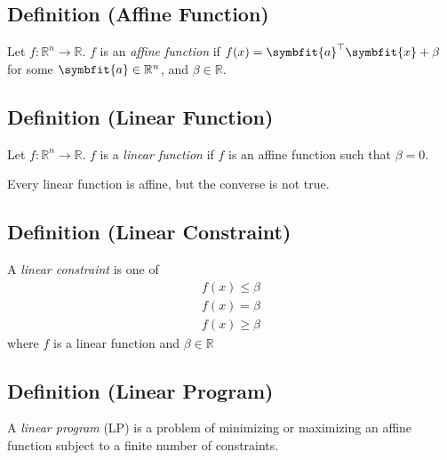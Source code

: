 \begin{defbox}
    \subsection{Definition (Affine Function)}
    Let $f:\mathbb{R}^n\rightarrow\mathbb{R}$. $f$ is an \emph{affine function} if
    $f(x)=\symbfit{a}^\top \symbfit{x}+\beta$ for some $\symbfit{a}\in\mathbb{R}^n$, and $\beta\in\mathbb{R}$.    
\end{defbox}

\begin{defbox}
    \subsection{Definition (Linear Function)}
    Let $f:\mathbb{R}^n\rightarrow\mathbb{R}$. $f$ is a \emph{linear function} if
    $f$ is an affine function such that $\beta=0$.
\end{defbox}

\begin{remark}
    Every linear function is affine, but the converse is not true.
\end{remark}

\begin{defbox}
    \subsection{Definition (Linear Constraint)}
    A \emph{linear constraint} is one of
    \begin{align*}
        f(x)\le \beta\\
        f(x)=\beta\\
        f(x)\ge \beta
    \end{align*}
    where $f$ is a linear function and $ \beta\in\mathbb{R} $
\end{defbox}

\begin{defbox}
    \subsection{Definition (Linear Program)}
    A \emph{linear program} (LP) is a problem of minimizing or
    maximizing an affine function subject to a finite number
    of constraints.
\end{defbox}